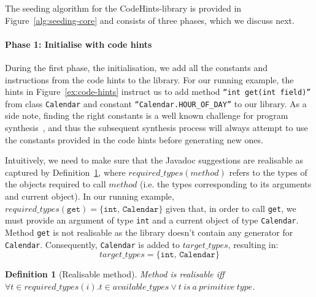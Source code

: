 \documentclass[10pt,conference]{IEEEtran}
\newtheorem{definition}{Definition}
\begin{document}
The seeding algorithm for the CodeHints-library is provided in Figure~\ref{alg:seeding-core} and consists of three phases, which we discuss next.

\paragraph{{\bf Phase 1: Initialise with code hints}}
During the first phase, the initialisation, we add all the constants and instructions from the code hints to the library.
%
For our running example, the hints in Figure~\ref{ex:code-hints} %
instruct us to add method \texttt{``int get(int field)''} from class
\texttt{Calendar} and constant \texttt{``Calendar.HOUR\_OF\_DAY''} to our library.
As a side note, finding the right constants is a well known
challenge for program synthesis~\cite{DBLP:conf/cav/AbateDKKP18}, and thus the subsequent
synthesis process will always attempt to use the constants provided in the code hints before generating new ones.

Intuitively, we need to make sure that the Javadoc suggestions
are realisable as captured by Definition~\ref{def:realizable}, where 
$required\_types(method)$ refers to the types of the objects required to call $method$ (i.e. the types corresponding to its arguments and current object).
In our running example, $required\_types(\texttt{get}) = \{\texttt{int, Calendar}\}$
given that, in order to call \texttt{get}, we must provide an argument of type \texttt{int} and a current object of type \texttt{Calendar}.
Method \texttt{get} is not realisable as the library doesn't contain any generator for \texttt{Calendar}.
Consequently, \texttt{Calendar} is added to $target\_types$, resulting in:
$$target\_types = \{\texttt{int, Calendar}\}$$

\begin{definition}[Realisable method]\label{def:realizable}
Method  is {\em realisable} iff $\forall t \in required\_types(i). t \in available\_types \vee t~is~a~primitive~type$.
\end{definition}
\end{document}
